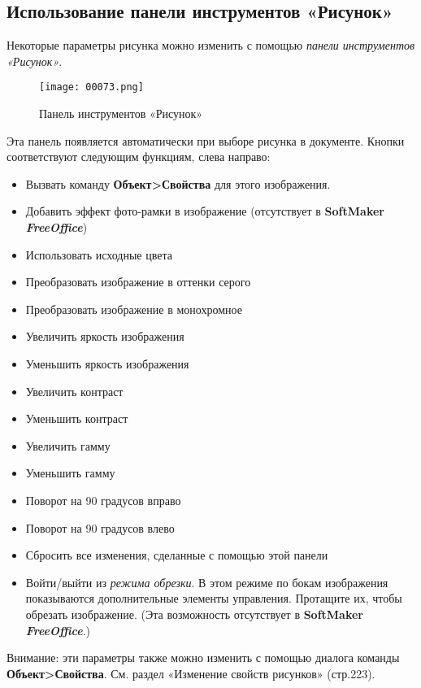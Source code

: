 ﻿\documentclass[a4paper,10pt]{article}
\begin{document}
\subsection{Использование панели инструментов «Рисунок»}
Некоторые параметры рисунка можно изменить с помощью \textit{панели инструментов «Рисунок»}.

\begin{figure}[ht]
\texttt{[image: 00073.png]}
\centering
\caption{Панель инструментов «Рисунок»}
\end{figure}

Эта панель появляется автоматически при выборе рисунка в документе. Кнопки соответствуют следующим функциям, слева направо:
\begin{itemize}
 \item Вызвать команду \textbf{Объект>Свойства} для этого изображения.
 \item Добавить эффект фото-рамки в изображение (отсутствует в \textbf{SoftMaker \textit{FreeOffice}})
 \item Использовать исходные цвета
 \item Преобразовать изображение в оттенки серого
 \item Преобразовать изображение в монохромное
 \newline
 \item Увеличить яркость изображения
 \item Уменьшить яркость изображения
 \newline
 \item Увеличить контраст
 \item Уменьшить контраст
 \newline
 \item Увеличить гамму
 \item Уменьшить гамму
 \newline
 \item Поворот на 90 градусов вправо
 \item Поворот на 90 градусов влево
 \newline
 \item Сбросить все изменения, сделанные с помощью этой панели
 \item Войти/выйти из \textit{режима обрезки}. В этом режиме по бокам изображения показываются дополнительные элементы управления. Протащите их, чтобы обрезать изображение. (Эта возможность отсутствует в \textbf{SoftMaker \textit{FreeOffice}}.)
 \end{itemize}
 
 Внимание: эти параметры также можно изменить с помощью диалога команды \textbf{Объект>Свойства}. См. раздел «Изменение свойств рисунков» (стр.223).
 
\end{document}

